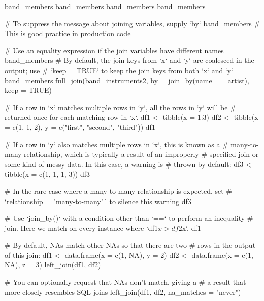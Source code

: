 \documentclass[a4paper]{book}
\begin{document}
\begin{Examples}
\begin{ExampleCode}
band_members %
band_members %
band_members %
band_members %

# To suppress the message about joining variables, supply `by`
band_members %
# This is good practice in production code

# Use an equality expression if the join variables have different names
band_members %
# By default, the join keys from `x` and `y` are coalesced in the output; use
# `keep = TRUE` to keep the join keys from both `x` and `y`
band_members %
  full_join(band_instruments2, by = join_by(name == artist), keep = TRUE)

# If a row in `x` matches multiple rows in `y`, all the rows in `y` will be
# returned once for each matching row in `x`.
df1 <- tibble(x = 1:3)
df2 <- tibble(x = c(1, 1, 2), y = c("first", "second", "third"))
df1 %

# If a row in `y` also matches multiple rows in `x`, this is known as a
# many-to-many relationship, which is typically a result of an improperly
# specified join or some kind of messy data. In this case, a warning is
# thrown by default:
df3 <- tibble(x = c(1, 1, 1, 3))
df3 %

# In the rare case where a many-to-many relationship is expected, set
# `relationship = "many-to-many"` to silence this warning
df3 %

# Use `join_by()` with a condition other than `==` to perform an inequality
# join. Here we match on every instance where `df1$x > df2$x`.
df1 %

# By default, NAs match other NAs so that there are two
# rows in the output of this join:
df1 <- data.frame(x = c(1, NA), y = 2)
df2 <- data.frame(x = c(1, NA), z = 3)
left_join(df1, df2)

# You can optionally request that NAs don't match, giving a
# a result that more closely resembles SQL joins
left_join(df1, df2, na_matches = "never")
\end{ExampleCode}
\end{Examples}
\end{document}
